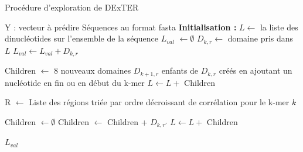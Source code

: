 \documentclass[french]{llncs}
\begin{document}
\begin{algorithm}
\caption{Procédure d'exploration de DExTER}
\label{pseudo_code_dexter}
\begin{algorithmic}
\REQUIRE 
\STATE Y  :  vecteur à prédire
\STATE Séquences au format fasta
\STATE \textbf{Initialisation :}
\STATE $L \leftarrow$  la liste des dinucléotides sur l'ensemble de la séquence
\STATE $L_{val}$ $\leftarrow  \emptyset$
\STATE 
\STATE $D_{k,r} \leftarrow$ domaine pris dans $L$
\STATE $L_{val} \leftarrow  L_{val}+D_{k,r}  $
\STATE  {}

\STATE Children $\leftarrow$ 8 nouveaux domaines $D_{k+1,r}$ enfants de $D_{k,r}$ créés en ajoutant un nucléotide en fin ou en début du k-mer
\STATE $L \leftarrow L +$ Children

\ELSE 
\STATE  {}

\STATE R $\leftarrow$ Liste des régions triée par ordre décroissant de corrélation pour le k-mer $k$

\STATE Children $\leftarrow \emptyset$ 
\STATE Children $\leftarrow$ Children + $D_{k,r'}$
\ENDIF
\ENDFOR
\STATE $L \leftarrow L +$ Children
\ENDIF
\ENDIF
\ENDWHILE

\RETURN $L_{val}$
\end{algorithmic}
\end{algorithm}

\end{document}
